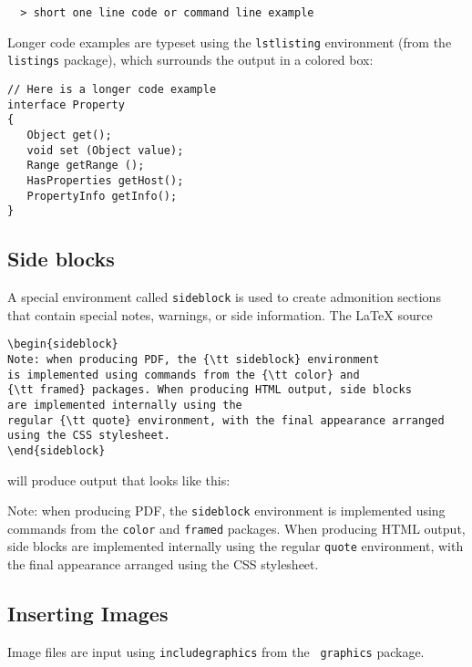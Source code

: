 \documentclass{article}
\begin{document}
\begin{verbatim}
  > short one line code or command line example
\end{verbatim}

Longer code examples are typeset using the {\tt lstlisting}
environment (from the {\tt listings} package), which surrounds
the output in a colored box:

\begin{lstlisting}[]
// Here is a longer code example
interface Property
{
   Object get(); 
   void set (Object value); 
   Range getRange ();
   HasProperties getHost();
   PropertyInfo getInfo();
}
\end{lstlisting}

\subsection{Side blocks}
\label{SideBlocksSec}

A special environment called {\tt sideblock} is used to create
admonition sections that contain special notes, warnings, or side
information. The LaTeX source

\begin{lstlisting}[]
\begin{sideblock}
Note: when producing PDF, the {\tt sideblock} environment
is implemented using commands from the {\tt color} and
{\tt framed} packages. When producing HTML output, side blocks
are implemented internally using the
regular {\tt quote} environment, with the final appearance arranged
using the CSS stylesheet. 
\end{sideblock}
\end{lstlisting}

will produce output that looks like this:

\begin{sideblock}
Note: when producing PDF, the {\tt sideblock} environment
is implemented using commands from the {\tt color} and
{\tt framed} packages. When producing HTML output, side blocks
are implemented internally using the
regular {\tt quote} environment, with the final appearance arranged
using the CSS stylesheet. 
\end{sideblock}

\subsection{Inserting Images}

Image files are input using {\tt \BKS includegraphics} from the {\tt
graphics} package. 
\end{document}
